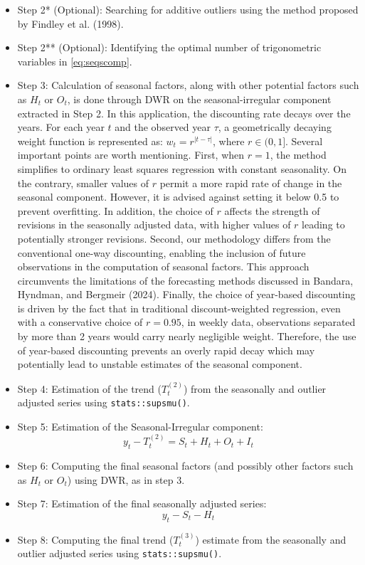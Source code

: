 \begin{itemize}
\item
  Step 2* (Optional): Searching for additive outliers using the method proposed by Findley et al. (1998).
\item
  Step 2** (Optional): Identifying the optimal number of trigonometric variables in \eqref{eq:seqscomp}.
\item
  Step 3: Calculation of seasonal factors, along with other potential factors such as \(H_{t}\) or \(O_{t}\), is done through DWR on the seasonal-irregular component extracted in Step 2. In this application, the discounting rate decays over the years. For each year \(t\) and the observed year \(\tau\), a geometrically decaying weight function is represented as: \(w_{t}=r^{|t-\tau|}\), where \(r \in (0,1]\). Several important points are worth mentioning. First, when \(r=1\), the method simplifies to ordinary least squares regression with constant seasonality. On the contrary, smaller values of \(r\) permit a more rapid rate of change in the seasonal component. However, it is advised against setting it below 0.5 to prevent overfitting. In addition, the choice of \(r\) affects the strength of revisions in the seasonally adjusted data, with higher values of \(r\) leading to potentially stronger revisions. Second, our methodology differs from the conventional one-way discounting, enabling the inclusion of future observations in the computation of seasonal factors. This approach circumvents the limitations of the forecasting methods discussed in Bandara, Hyndman, and Bergmeir (2024). Finally, the choice of year-based discounting is driven by the fact that in traditional discount-weighted regression, even with a conservative choice of \(r=0.95\), in weekly data, observations separated by more than 2 years would carry nearly negligible weight. Therefore, the use of year-based discounting prevents an overly rapid decay which may potentially lead to unstable estimates of the seasonal component.
\item
  Step 4: Estimation of the trend (\(T_{t}^{(2)}\)) from the seasonally and outlier adjusted series using \texttt{stats::supsmu()}.
\item
  Step 5: Estimation of the Seasonal-Irregular component:
  \[y_{t}-T_{t}^{(2)}=S_{t}+H_{t}+O_{t}+I_{t}\]
\item
  Step 6: Computing the final seasonal factors (and possibly other factors such as \(H_{t}\) or \(O_{t}\)) using DWR, as in step 3.
\item
  Step 7: Estimation of the final seasonally adjusted series:
  \[y_{t}-S_{t}-H_{t}\]
\item
  Step 8: Computing the final trend (\(T_{t}^{(3)}\)) estimate from the seasonally and outlier adjusted series using \texttt{stats::supsmu()}.
\end{itemize}

